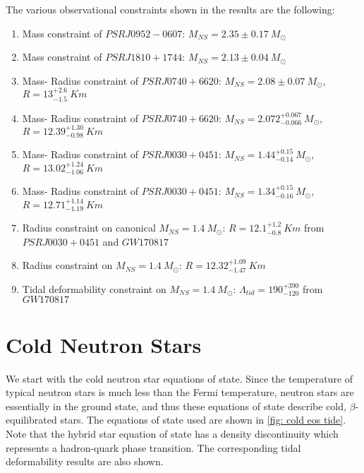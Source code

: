 \documentclass[a4paper,12pt,onehalfspacing]{report}
\begin{document}
The various observational constraints shown in the results are the following:
\begin{enumerate}
    \item Mass constraint of $PSR J0952-0607$: $M_{NS}= 2.35\pm 0.17\ M_\odot$ \cite{romaniPSRJ095206072022}
    \item Mass constraint of $PSR J1810+1744$: $M_{NS}= 2.13\pm 0.04\ M_\odot$ \cite{romaniPSRJ181017442021}
    \item Mass- Radius constraint of $PSR J0740+6620$: $M_{NS}= 2.08\pm 0.07\ M_\odot$, $R= 13^{+2.6}_{-1.5}\ Km$ \cite{millerRadiusPSRJ07402021}
    \item Mass- Radius constraint of $PSR J0740+6620$: $M_{NS}= 2.072^{+0.067}_{-0.066}\ M_\odot$, $R= 12.39^{+1.30}_{-0.98}\ Km$ \cite{rileyNICERViewMassive2021}
    \item Mass- Radius constraint of $PSR J0030+0451$: $M_{NS}= 1.44^{+0.15}_{-0.14}\ M_\odot$, $R= 13.02^{+1.24}_{-1.06}\ Km$ \cite{millerPSRJ003004512019}
    \item Mass- Radius constraint of $PSR J0030+0451$: $M_{NS}= 1.34^{+0.15}_{-0.16}\ M_\odot$, $R= 12.71^{+1.14}_{-1.19}\ Km$ \cite{rileyNICERViewPSR2019}
    \item Radius constraint on canonical $M_{NS}= 1.4\ M_\odot$: $R= 12.1^{+1.2}_{-0.8}\ Km$ from $PSR J0030+0451$ and $GW170817$ \cite{jiangPSRJ003004512020}
    \item Radius constraint on $M_{NS}= 1.4\ M_\odot$: $R= 12.32^{+1.09}_{-1.47}\ Km$ \cite{landryNonparametricConstraintsNeutron2020}
    \item Tidal deformability constraint on $M_{NS}= 1.4\ M_\odot$: $\Lambda_{tid}= 190^{+390}_{-120}$ from $GW170817$ \cite{landryNonparametricConstraintsNeutron2020}
\end{enumerate}

\FloatBarrier

\section{Cold Neutron Stars}

We start with the cold neutron star equations of state. Since the temperature of typical neutron stars is much less than the Fermi temperature, neutron stars are essentially in the ground state, and thus these equations of state describe cold, $\beta$- equilibrated stars. The equations of state used are shown in \cref{fig: cold eos tide}. Note that the hybrid star equation of state has a density discontinuity which represents a hadron-quark phase transition. The corresponding tidal deformability results are also shown. 
\end{document}
